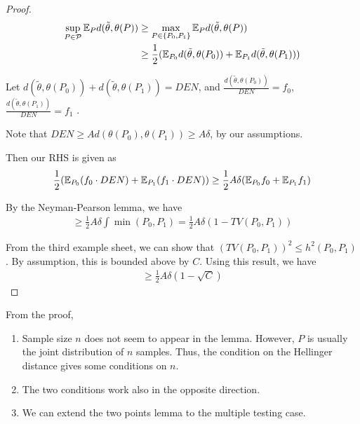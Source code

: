 \begin{proof}
  \begin{align}
    \label{eq:111}
    \sup_{P \in \mathcal{P}} \E_{P} d(\tilde \theta, \theta(P)) &\geq
    \max_{P \in \{ P_{0}, P_{1} \}} \E_{P} d(\tilde \theta, \theta(P))
    \\
    &\geq \frac{1}{2} (\E_{P_{0}} d(\tilde \theta, \theta(P_{0})) +
    \E_{P_{1}} d(\tilde \theta, \theta(P_{1}))) \\
  \end{align}

Let $d(\tilde \theta, \theta(P_{0})) + d(\tilde \theta, \theta(P_{1}))
= DEN$, and $\frac{d(\tilde \theta, \theta(P_{0}))}{DEN} = f_{0}$,
$\frac{d(\tilde \theta, \theta(P_{1}))}{DEN} = f_{1}$ .

Note that $DEN \geq Ad(\theta(P_{0}), \theta(P_{1})) \geq A \delta$,
by our assumptions.

Then our RHS is given as
\begin{align}
  \label{eq:112}
  \frac{1}{2} (\E_{P_{0}}(f_{0} \cdot DEN) + \E_{P_{1}} (f_{1} \cdot
  DEN)) \geq \frac{1}{2} A \delta (\E_{P_{0}} f_{0} + \E_{P_{1}} f_{1})
\end{align}

By the Neyman-Pearson lemma, we have
\begin{align}
  \label{eq:113}
  \geq \frac{1}{2} A \delta \int \min(P_{0}, P_{1}) = \frac{1}{2} A
  \delta (1 - TV(P_{0}, P_{1}))
\end{align}

From the third example sheet, we can show that $(TV(P_{0}, P_{1}))^{2}
\leq h^{2}(P_{0}, P_{1})$.  By assumption, this is bounded above by
$C$.  Using this result, we have
\begin{align}
  \label{eq:114}
  \geq \frac{1}{2} A \delta (1 - \sqrt{C})
\end{align}

\end{proof}

\begin{remark} From the proof,
  \begin{enumerate}
  \item Sample size $n$ does not seem to appear in the lemma.
    However, $P$ is usually the joint distribution of $n$ samples.
    Thus, the condition on the Hellinger distance gives some
    conditions on $n$.
  \item The two conditions work also in the opposite direction.
  \item We can extend the two points lemma to the multiple testing case.
  \end{enumerate}
\end{remark}

